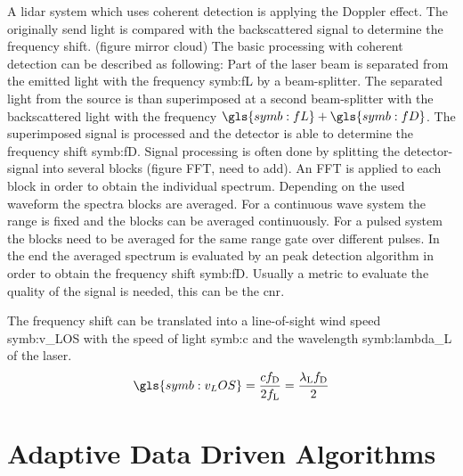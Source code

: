 A lidar system which uses coherent detection is applying the Doppler effect. The originally send light is compared with the backscattered signal to determine the frequency shift. (figure mirror cloud) The basic processing with coherent detection can be described as following: Part of the laser beam is separated from the emitted light with the frequency \gls{symb:fL} by a beam-splitter. The separated light from the source is than superimposed at a second beam-splitter with the backscattered light with the frequency $\gls{symb:fL} + \gls{symb:fD}$. The superimposed signal is processed and the detector is able to determine the frequency shift \gls{symb:fD}. 
Signal processing is often done by splitting the detector-signal into several blocks (figure FFT, need to add). An \gls{FFT} is applied to each block in order to obtain the individual spectrum. Depending on the used waveform the spectra blocks are averaged. For a continuous wave system the range is fixed and the blocks can be averaged continuously. For a pulsed system the blocks need to be averaged for the same range gate over different pulses. In the end the averaged spectrum is evaluated by an peak detection algorithm in order to obtain the frequency shift \gls{symb:fD}. Usually a metric to evaluate the quality of the signal is needed, this can be the \gls{cnr}.

The frequency shift can be translated into a line-of-sight wind speed \gls{symb:v_LOS} with the speed of light \gls{symb:c} and the wavelength \gls{symb:lambda_L} of the laser.
\[ \gls{symb:v_LOS} =  \frac{c f_\textnormal{D}}{2f_\textnormal{L}} = \frac{\lambda_\textnormal{L} f_\textnormal{D}}{2}\]


\section{Adaptive Data Driven Algorithms}\label{sec:AlgBasics}